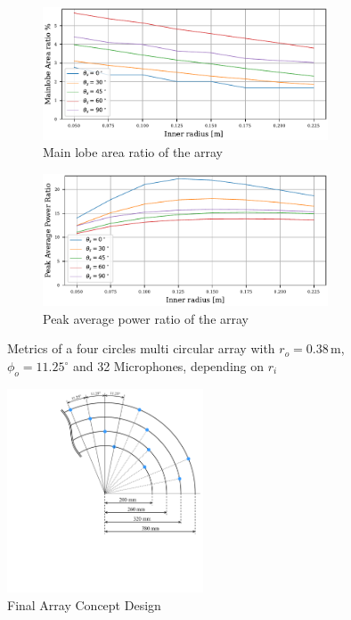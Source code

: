 \newpage
\begin{figure}[h!]
	\centering
	\begin{subfigure}[b]{1\textwidth}
		\centering
		\includegraphics[width=0.93\textwidth, trim={0 0.2cm 0 0.2cm}]{images/5_array_evaluation/final_flat_area.pdf}
		\caption{Main lobe area ratio of the array}
		\label{fig:finar}
	\end{subfigure}
	\begin{subfigure}[b]{1\textwidth}
		\centering
		\includegraphics[width=0.93\textwidth, trim={0 0.2cm 0 0}]{images/5_array_evaluation/final_flat_PAP.pdf}
		\caption{Peak average power ratio of the array}
		\label{fig:finpap}
	\end{subfigure}
	\caption{Metrics of a four circles multi circular array with $r_o=0.38$\,m,
		$\phi_o = 11.25^\circ$ and 32 Microphones, depending on $r_i$ }
	\label{fig:finflat}
\end{figure}
\begin{figure}[h!]
	\centering
	\vspace{-0.5cm}
	\includegraphics[width=0.52\textwidth, trim={5.5cm 6.1cm 0 0}]{images/5_array_evaluation/final_array_concept_design.pdf}
	\caption{Final Array Concept Design}
	\label{fig:final_array_concept_design}
\end{figure}

